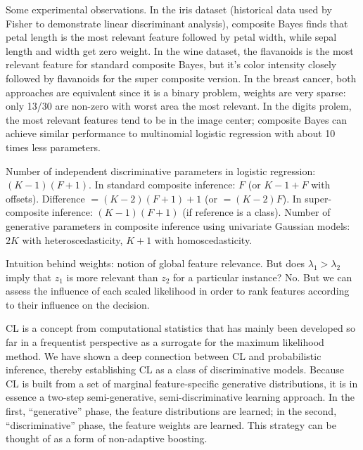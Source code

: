 \documentclass[english]{scrartcl}
\def\y{{\mathbf{y}}}
\newcommand{\blambda}{{\boldsymbol{\lambda}}}
\begin{document}

Some experimental observations. In the iris dataset (historical data used by Fisher to demonstrate linear discriminant analysis), composite Bayes finds that petal length is the most relevant feature followed by petal width, while sepal length and width get zero weight. In the wine dataset, the flavanoids is the most relevant feature for standard composite Bayes, but it's color intensity closely followed by flavanoids for the super composite version. In the breast cancer, both approaches are equivalent since it is a binary problem, weights are very sparse: only 13/30 are non-zero with worst area the most relevant. In the digits prolem, the most relevant features tend to be in the image center; composite Bayes can achieve similar performance to multinomial logistic regression with about 10 times less parameters.

Number of independent discriminative parameters in logistic regression: $(K-1)(F+1)$. In standard composite inference: $F$ (or $K-1+F$ with offsets). Difference $=(K-2)(F+1)+1$ (or $=(K-2)F$). In super-composite inference: $(K-1)(F+1)$ (if reference is a class). Number of generative parameters in composite inference using univariate Gaussian models: $2K$ with heteroscedasticity, $K+1$ with homoscedasticity.

Intuition behind weights: notion of global feature relevance. But does $\lambda_1>\lambda_2$ imply that $z_1$ is more relevant than $z_2$ for a particular instance? No. But we can assess the influence of each scaled likelihood in order to rank features according to their influence on the decision.

CL is a concept from computational statistics that has mainly been developed so far in a frequentist perspective as a surrogate for the maximum likelihood method. We have shown a deep connection between CL and probabilistic inference, thereby establishing CL as a class of discriminative models. Because CL is built from a set of marginal feature-specific generative distributions, it is in essence a two-step semi-generative, semi-discriminative learning approach. In the first, ``generative'' phase, the feature distributions are learned; in the second, ``discriminative'' phase, the feature weights are learned. This strategy can be thought of as a form of non-adaptive boosting.
\end{document}
